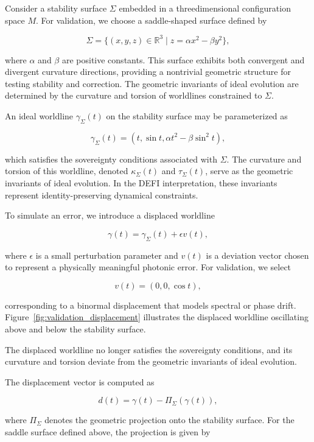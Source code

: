 \documentclass[aip,adv,reprint,floatfix]{revtex4-2}
\begin{document}
Consider a stability surface $\Sigma$ embedded in a threedimensional configuration space $M$. For validation, we
choose a saddle-shaped surface defined by


\[
\Sigma = \{(x, y, z) \in \mathbb{R}^{3} \mid z = \alpha x^{2} - \beta y^{2}\},
\]


where $\alpha$ and $\beta$ are positive constants.\cite{DuttonElectronField2026}
This surface exhibits both convergent and divergent curvature directions, providing a nontrivial geometric structure for testing stability and correction. The geometric invariants
of ideal evolution are determined by the curvature and
torsion of worldlines constrained to $\Sigma$.

An ideal worldline $\gamma_{\Sigma}(t)$ on the stability surface may
be parameterized as


\[
\gamma_{\Sigma}(t) = (t, \sin t, \alpha t^{2} - \beta \sin^{2} t),
\]


which satisfies the sovereignty conditions associated with
$\Sigma$.\cite{DuttonSEFI2026} The curvature and torsion of this worldline, denoted
$\kappa_{\Sigma}(t)$ and $\tau_{\Sigma}(t)$, serve as the geometric invariants of ideal
evolution. In the DEFI interpretation, these invariants
represent identity-preserving dynamical constraints.

To simulate an error, we introduce a displaced worldline


\[
\gamma(t) = \gamma_{\Sigma}(t) + \epsilon v(t),
\]


where $\epsilon$ is a small perturbation parameter and $v(t)$ is a
deviation vector chosen to represent a physically meaningful photonic error.\cite{DuttonElectronField2026}
For validation, we select


\[
v(t) = (0, 0, \cos t),
\]


corresponding to a binormal displacement that models
spectral or phase drift. Figure~\ref{fig:validation_displacement}
illustrates the displaced worldline oscillating above and below the stability surface.

The displaced worldline no longer
satisfies the sovereignty conditions, and its curvature and
torsion deviate from the geometric invariants of ideal evolution.

The displacement vector is computed as


\[
d(t) = \gamma(t) - \Pi_{\Sigma}(\gamma(t)),
\]


where $\Pi_{\Sigma}$ denotes the geometric projection onto the stability surface.\cite{DuttonElectronField2026}
For the saddle surface defined above, the
projection is given by
\end{document}
